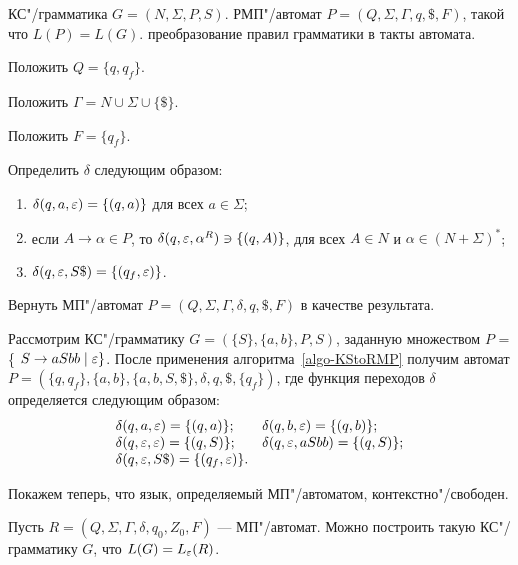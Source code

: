 {\label{algo-KStoRMP} КС"/грамматика $G = (N, \Sigma, P, S)$. }
{РМП"/автомат $P = (Q, \Sigma, \Gamma, q, \mathdollar, F)$, такой что $L(P) = L(G).$}
{преобразование правил грамматики в такты автомата.}
{
\item Положить $Q = \{ q, q_f \}$.

\item Положить $\Gamma = N \cup \Sigma \cup \{ \mathdollar \}$.
\item Положить $F = \{ q_f \}$. 

\item Определить $\delta$ следующим образом:
	\begin{enumerate}[itemindent=\parindent,leftmargin=!]
		\item $\delta(q, a, \varepsilon) = \{ (q, a) \}$ для всех $a \in \Sigma$;
		\item если $A \to \alpha \in P$, то $\delta(q, \varepsilon, \alpha^R) \ni \{ (q, A) \}$, для всех $A \in N$ и $\alpha \in (N + \Sigma)^*$;
		\item $\delta(q, \varepsilon, S\mathdollar) = \{ (q_f, \varepsilon) \}$.
  \end{enumerate}  

\item Вернуть МП"/автомат $P = (Q, \Sigma, \Gamma, \delta, q, \mathdollar, F)$ в качестве результата.
}

\begin{myexample}
Рассмотрим КС"/грамматику $G = (\{S\}, \{a, b\}, P, S)$, заданную множеством $P$ = \{ $S \to aSbb \mid \varepsilon \}$.
После применения алгоритма~\ref{algo-KStoRMP} получим автомат $P = (\{q, q_f\},  \{a, b\}, \{a, b, S, \mathdollar\}, \delta, q, \mathdollar, \{q_f\})$, где функция переходов $\delta$ определяется следующим образом:
\[\begin{array}{ll}
    \delta(q, a, \varepsilon) 	= \{ (q, a) \}; &
    \delta(q, b, \varepsilon) 	= \{ (q, b) \}; \\
    \delta(q, \varepsilon, \varepsilon) = \{ (q, S) \}; &
    \delta(q, \varepsilon, aSbb) = \{ (q, S) \}; \\
    \delta(q, \varepsilon, S\mathdollar) = \{ (q_f, \varepsilon) \}. &
\end{array}\]
\end{myexample}

Покажем теперь, что язык, определяемый МП"/автоматом, контекстно"/свободен.

\begin{mytheorem}
\label{pda2cfg}
Пусть $R=(Q,\Sigma,\Gamma,\delta,q_0,Z_0,F)$ --- МП"/автомат. Можно построить такую КС"/грамматику $G$, что $L(G)=L_\varepsilon(R)$.
\end{mytheorem}

